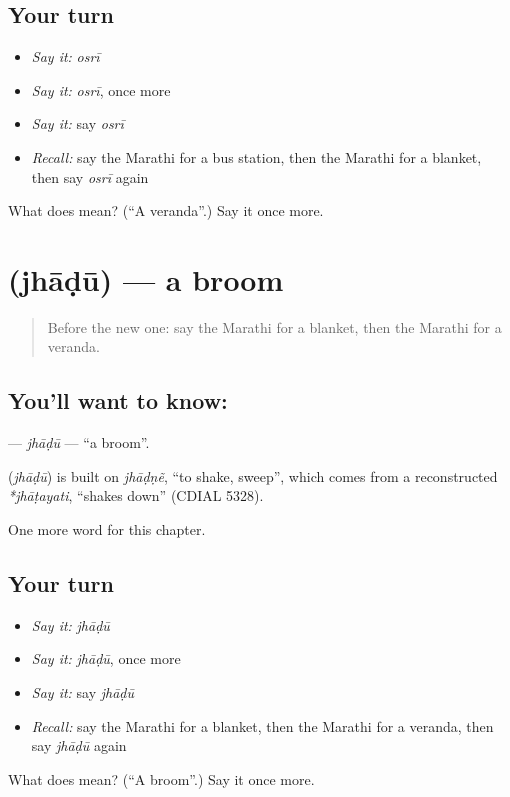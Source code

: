 \subsection*{Your turn}
\begin{itemize}
\raggedright
  \item \emph{Say it:} \emph{osrī}
  \item \emph{Say it:} \emph{osrī}, once more
  \item \emph{Say it:} say \emph{osrī}
  \item \emph{Recall:} say the Marathi for a bus station, then the Marathi for a blanket, then say \emph{osrī} again
\end{itemize}

\begin{tcolorbox}[breakable,colback=teal!4,colframe=teal!35!black,title={Before you move on}]
What does  mean? (\textquotedblleft{}A veranda\textquotedblright{}.) Say it once more.
\end{tcolorbox}
\section[\texorpdfstring{\mr{झाडू} (jhāḍū)}{झाडू (jhāḍū)}]{ (jhāḍū) — a broom}

\label{lesson:MR-C271-jhadu}



\begin{quote}
Before the new one: say the Marathi for a blanket, then the Marathi for a veranda.
\end{quote}

\subsection*{You'll want to know: }
\textbf{} — \emph{jhāḍū} — \textquotedblleft{}a broom\textquotedblright{}.

\begin{cousinweb}
\textbf{} (\emph{jhāḍū}) is built on \emph{jhāḍṇẽ}, \textquotedblleft{}to shake, sweep\textquotedblright{}, which comes from a reconstructed \emph{*jhāṭayati}, \textquotedblleft{}shakes down\textquotedblright{} (CDIAL 5328).
\end{cousinweb}

\begin{grammarlens}[title={What you've built}]
One more word for this chapter.
\end{grammarlens}

\subsection*{Your turn}
\begin{itemize}
\raggedright
  \item \emph{Say it:} \emph{jhāḍū}
  \item \emph{Say it:} \emph{jhāḍū}, once more
  \item \emph{Say it:} say \emph{jhāḍū}
  \item \emph{Recall:} say the Marathi for a blanket, then the Marathi for a veranda, then say \emph{jhāḍū} again
\end{itemize}

\begin{tcolorbox}[breakable,colback=teal!4,colframe=teal!35!black,title={Before you move on}]
What does  mean? (\textquotedblleft{}A broom\textquotedblright{}.) Say it once more.
\end{tcolorbox}

